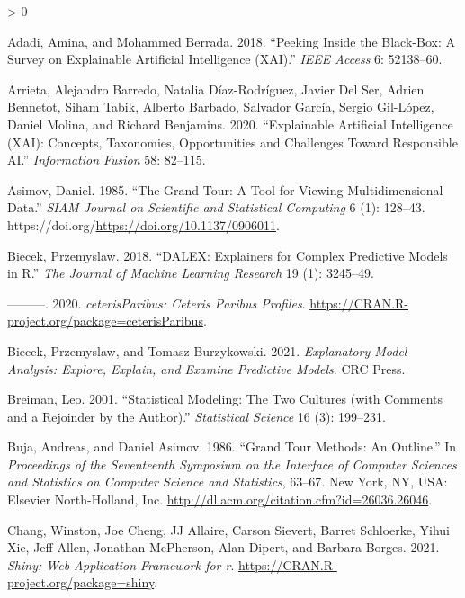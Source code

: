 \documentclass[
  article]{article}
\newlength{\cslhangindent}
\newenvironment{CSLReferences}[2] %
 {%
  \setlength{\parindent}{0pt}
  \ifodd #1 \everypar{\setlength{\hangindent}{\cslhangindent}}\ignorespaces\fi
  \ifnum #2 > 0
  \setlength{\parskip}{#2\baselineskip}
  \fi
 }%
 {}
\begin{document}
\hypertarget{refs}{}
\begin{CSLReferences}{1}{0}
\leavevmode\hypertarget{ref-adadi_peeking_2018}{}%
Adadi, Amina, and Mohammed Berrada. 2018. {``Peeking Inside the Black-Box: A Survey on Explainable Artificial Intelligence ({XAI}).''} \emph{IEEE Access} 6: 52138--60.

\leavevmode\hypertarget{ref-arrieta_explainable_2020}{}%
Arrieta, Alejandro Barredo, Natalia Díaz-Rodríguez, Javier Del Ser, Adrien Bennetot, Siham Tabik, Alberto Barbado, Salvador García, Sergio Gil-López, Daniel Molina, and Richard Benjamins. 2020. {``Explainable {Artificial} {Intelligence} ({XAI}): {Concepts}, Taxonomies, Opportunities and Challenges Toward Responsible {AI}.''} \emph{Information Fusion} 58: 82--115.

\leavevmode\hypertarget{ref-asimov_grand_1985}{}%
Asimov, Daniel. 1985. {``The {Grand} {Tour}: A {Tool} for {Viewing} {Multidimensional} {Data}.''} \emph{SIAM Journal on Scientific and Statistical Computing} 6 (1): 128--43. https://doi.org/\url{https://doi.org/10.1137/0906011}.

\leavevmode\hypertarget{ref-biecek_dalex_2018}{}%
Biecek, Przemyslaw. 2018. {``{DALEX}: Explainers for Complex Predictive Models in {R}.''} \emph{The Journal of Machine Learning Research} 19 (1): 3245--49.

\leavevmode\hypertarget{ref-biecek_ceterisparibus_2020}{}%
---------. 2020. \emph{{ceterisParibus}: {Ceteris} {Paribus} {Profiles}}. \url{https://CRAN.R-project.org/package=ceterisParibus}.

\leavevmode\hypertarget{ref-biecek_explanatory_2021}{}%
Biecek, Przemyslaw, and Tomasz Burzykowski. 2021. \emph{Explanatory {Model} {Analysis}: {Explore}, {Explain}, and {Examine} {Predictive} {Models}}. CRC Press.

\leavevmode\hypertarget{ref-breiman_statistical_2001}{}%
Breiman, Leo. 2001. {``Statistical Modeling: {The} Two Cultures (with Comments and a Rejoinder by the Author).''} \emph{Statistical Science} 16 (3): 199--231.

\leavevmode\hypertarget{ref-buja_grand_1986}{}%
Buja, Andreas, and Daniel Asimov. 1986. {``Grand {Tour} {Methods}: {An} {Outline}.''} In \emph{Proceedings of the {Seventeenth} {Symposium} on the {Interface} of {Computer} {Sciences} and {Statistics} on {Computer} {Science} and {Statistics}}, 63--67. New York, NY, USA: Elsevier North-Holland, Inc. \url{http://dl.acm.org/citation.cfm?id=26036.26046}.

\leavevmode\hypertarget{ref-chang_shiny_2021}{}%
Chang, Winston, Joe Cheng, JJ Allaire, Carson Sievert, Barret Schloerke, Yihui Xie, Jeff Allen, Jonathan McPherson, Alan Dipert, and Barbara Borges. 2021. \emph{Shiny: Web Application Framework for r}. \url{https://CRAN.R-project.org/package=shiny}.


\end{CSLReferences}
\end{document}
